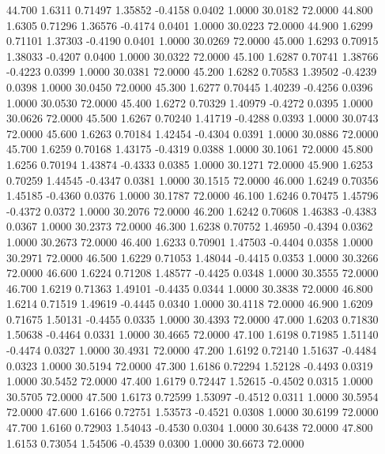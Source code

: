   44.700   1.6311   0.71497   1.35852  -0.4158   0.0402   1.0000  30.0182  72.0000
  44.800   1.6305   0.71296   1.36576  -0.4174   0.0401   1.0000  30.0223  72.0000
  44.900   1.6299   0.71101   1.37303  -0.4190   0.0401   1.0000  30.0269  72.0000
  45.000   1.6293   0.70915   1.38033  -0.4207   0.0400   1.0000  30.0322  72.0000
  45.100   1.6287   0.70741   1.38766  -0.4223   0.0399   1.0000  30.0381  72.0000
  45.200   1.6282   0.70583   1.39502  -0.4239   0.0398   1.0000  30.0450  72.0000
  45.300   1.6277   0.70445   1.40239  -0.4256   0.0396   1.0000  30.0530  72.0000
  45.400   1.6272   0.70329   1.40979  -0.4272   0.0395   1.0000  30.0626  72.0000
  45.500   1.6267   0.70240   1.41719  -0.4288   0.0393   1.0000  30.0743  72.0000
  45.600   1.6263   0.70184   1.42454  -0.4304   0.0391   1.0000  30.0886  72.0000
  45.700   1.6259   0.70168   1.43175  -0.4319   0.0388   1.0000  30.1061  72.0000
  45.800   1.6256   0.70194   1.43874  -0.4333   0.0385   1.0000  30.1271  72.0000
  45.900   1.6253   0.70259   1.44545  -0.4347   0.0381   1.0000  30.1515  72.0000
  46.000   1.6249   0.70356   1.45185  -0.4360   0.0376   1.0000  30.1787  72.0000
  46.100   1.6246   0.70475   1.45796  -0.4372   0.0372   1.0000  30.2076  72.0000
  46.200   1.6242   0.70608   1.46383  -0.4383   0.0367   1.0000  30.2373  72.0000
  46.300   1.6238   0.70752   1.46950  -0.4394   0.0362   1.0000  30.2673  72.0000
  46.400   1.6233   0.70901   1.47503  -0.4404   0.0358   1.0000  30.2971  72.0000
  46.500   1.6229   0.71053   1.48044  -0.4415   0.0353   1.0000  30.3266  72.0000
  46.600   1.6224   0.71208   1.48577  -0.4425   0.0348   1.0000  30.3555  72.0000
  46.700   1.6219   0.71363   1.49101  -0.4435   0.0344   1.0000  30.3838  72.0000
  46.800   1.6214   0.71519   1.49619  -0.4445   0.0340   1.0000  30.4118  72.0000
  46.900   1.6209   0.71675   1.50131  -0.4455   0.0335   1.0000  30.4393  72.0000
  47.000   1.6203   0.71830   1.50638  -0.4464   0.0331   1.0000  30.4665  72.0000
  47.100   1.6198   0.71985   1.51140  -0.4474   0.0327   1.0000  30.4931  72.0000
  47.200   1.6192   0.72140   1.51637  -0.4484   0.0323   1.0000  30.5194  72.0000
  47.300   1.6186   0.72294   1.52128  -0.4493   0.0319   1.0000  30.5452  72.0000
  47.400   1.6179   0.72447   1.52615  -0.4502   0.0315   1.0000  30.5705  72.0000
  47.500   1.6173   0.72599   1.53097  -0.4512   0.0311   1.0000  30.5954  72.0000
  47.600   1.6166   0.72751   1.53573  -0.4521   0.0308   1.0000  30.6199  72.0000
  47.700   1.6160   0.72903   1.54043  -0.4530   0.0304   1.0000  30.6438  72.0000
  47.800   1.6153   0.73054   1.54506  -0.4539   0.0300   1.0000  30.6673  72.0000
